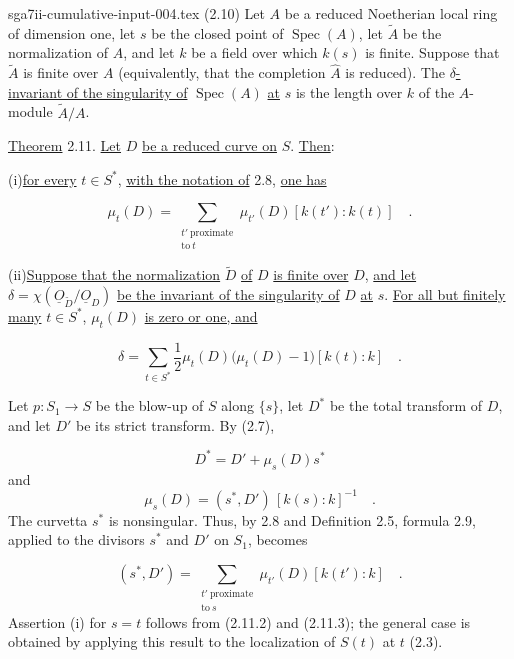 \begin{filecontents*}{sga7ii-cumulative-input-004.tex}
(2.10) Let $A$ be a reduced Noetherian local ring of dimension one, let $s$ be the
closed point of $\operatorname{Spec}(A)$, let $\widetilde A$ be the normalization
of $A$, and let $k$ be a field over which $k(s)$ is finite.  Suppose that
$\widetilde A$ is finite over $A$ (equivalently, that the completion $\widehat A$
is reduced).  The \underline{$\delta$-invariant of the singularity of}
$\operatorname{Spec}(A)$ \underline{at} $s$ is the length over $k$ of the
$A$-module $\widetilde A/A$.


\underline{Theorem} 2.11. \underline{Let} $D$ \underline{be a reduced curve on}
$S$. \underline{Then}:

(i)\quad \underline{for every} $t\in S^*$, \underline{with the notation of} 2.8,
\underline{one has}

\begin{equation*}
\mu_t(D)
=\sum_{\substack{t'\ \mathrm{proximate}\\\mathrm{to}\ t}}
\mu_{t'}(D)[k(t'):k(t)] \quad .
\end{equation*}

(ii)\quad \underline{Suppose that the normalization} $\widetilde D$
\underline{of} $D$ \underline{is finite over} $D$, \underline{and let}
$\delta=\chi(\underline{O}_{\widetilde D}/\underline{O}_D)$
\underline{be the invariant of the singularity of} $D$ \underline{at} $s$.
\underline{For all but finitely many} $t\in S^*$, $\mu_t(D)$ \underline{is zero
or one, and}

\begin{equation*}
\delta
=\sum_{t\in S^*}\frac12\mu_t(D)\bigl(\mu_t(D)-1\bigr)[k(t):k] \quad .
\end{equation*}

Let $p:S_1\longrightarrow S$ be the blow-up of $S$ along $\{s\}$, let $D^*$ be
the total transform of $D$, and let $D'$ be its strict transform.  By (2.7),

\begin{equation}\tag{2.11.1}
D^*=D'+\mu_s(D)s^*
\end{equation}
and
\begin{equation}\tag{2.11.2}
\mu_s(D)=(s^*,D')\,[k(s):k]^{-1} \quad .
\end{equation}
The curvetta $s^*$ is nonsingular.  Thus, by 2.8 and Definition 2.5, formula 2.9,
applied to the divisors $s^*$ and $D'$ on $S_1$, becomes

\begin{equation}\tag{2.11.3}
(s^*,D')
=\sum_{\substack{t'\ \mathrm{proximate}\\\mathrm{to}\ s}}
\mu_{t'}(D)[k(t'):k] \quad .
\end{equation}
Assertion (i) for $s=t$ follows from (2.11.2) and (2.11.3); the general case is
obtained by applying this result to the localization of $S(t)$ at $t$ (2.3).


\end{filecontents*}
